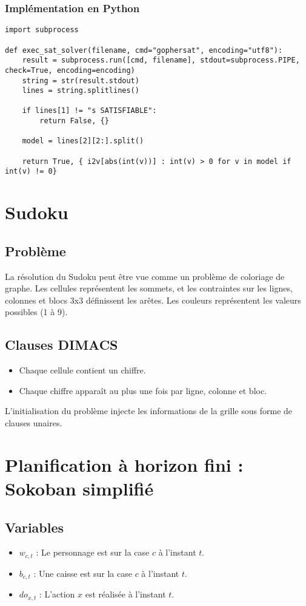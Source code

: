 \documentclass[a4paper,12pt]{article}
\begin{document}
\subsubsection{Implémentation en Python}
\begin{verbatim}
import subprocess

def exec_sat_solver(filename, cmd="gophersat", encoding="utf8"):
    result = subprocess.run([cmd, filename], stdout=subprocess.PIPE, check=True, encoding=encoding)
    string = str(result.stdout)
    lines = string.splitlines()

    if lines[1] != "s SATISFIABLE":
        return False, {}

    model = lines[2][2:].split()

    return True, { i2v[abs(int(v))] : int(v) > 0 for v in model if int(v) != 0}
\end{verbatim}

\section{Sudoku}

\subsection{Problème}
La résolution du Sudoku peut être vue comme un problème de coloriage de graphe. Les cellules représentent les sommets, et les contraintes sur les lignes, colonnes et blocs 3x3 définissent les arêtes. Les couleurs représentent les valeurs possibles (1 à 9).

\subsection{Clauses DIMACS}
\begin{itemize}
    \item Chaque cellule contient un chiffre.
    \item Chaque chiffre apparaît au plus une fois par ligne, colonne et bloc.
\end{itemize}

L'initialisation du problème injecte les informations de la grille sous forme de clauses unaires.

\section{Planification à horizon fini : Sokoban simplifié}

\subsection{Variables}
\begin{itemize}
    \item $w_{c,t}$ : Le personnage est sur la case $c$ à l'instant $t$.
    \item $b_{c,t}$ : Une caisse est sur la case $c$ à l'instant $t$.
    \item $do_{x,t}$ : L'action $x$ est réalisée à l'instant $t$.
\end{itemize}
\end{document}
